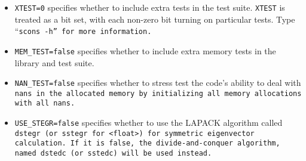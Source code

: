 \begin{enumerate}
\begin{itemize}
\item \texttt{XTEST=0} specifies whether to include extra tests in the test suite.  \texttt{XTEST}
is treated as a bit set, with each non-zero bit turning on particular tests.  Type ``\tt{scons -h}'' for 
more information.
\item \texttt{MEM\_TEST=false} specifies whether to include extra memory tests in the library and test suite.
\item \texttt{NAN\_TEST=false} specifies whether to stress test the code's ability to deal with \tt{nan}s in the allocated memory by initializing all memory allocations with all \tt{nan}s.
\item \texttt{USE\_STEGR=false} specifies whether to use the LAPACK algorithm called
\tt{dstegr} (or \tt{sstegr} for \tt{<float>}) for symmetric
eigenvector calculation.  If it is false, the divide-and-conquer algorithm,
named \tt{dstedc} (or \tt{sstedc}) will be used instead.


\end{itemize}
\end{enumerate}

